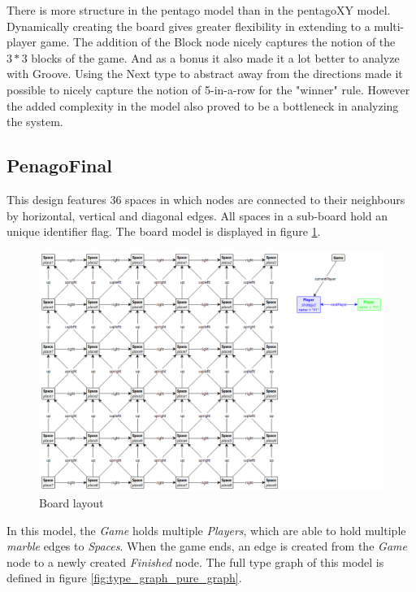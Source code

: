 \vspace{6pt}

There is more structure in the pentago model than in the pentagoXY model. Dynamically creating the board gives greater flexibility in extending to a multi-player game.
The addition of the Block node nicely captures the notion of the $3*3$ blocks of the game. And as a bonus it also made it a lot better to analyze with Groove.
Using the Next type to abstract away from the directions made it possible to nicely capture the notion of 5-in-a-row for the "winner" rule. However the added complexity in the model also proved to be a bottleneck in analyzing the system.

\subsection{PenagoFinal}

This design features 36 spaces in which nodes are connected to their neighbours by horizontal, vertical and diagonal edges.
All spaces in a sub-board hold an unique identifier flag.
The board model is displayed in figure \ref{fig:board1}.

\begin{figure}[h]
    \centering
    \includegraphics[scale=0.3,clip]{Images/board1.png}
    \caption{Board layout}
    \label{fig:board1}
\end{figure}

\vspace{6pt}

In this model, the \textit{Game} holds multiple \textit{Players}, which are able to hold multiple \textit{marble} edges to \textit{Spaces}. When the game ends, an edge is created from the \textit{Game} node to a newly created \textit{Finished} node. The full type graph of this model is defined in figure \ref{fig:type_graph_pure_graph}.


